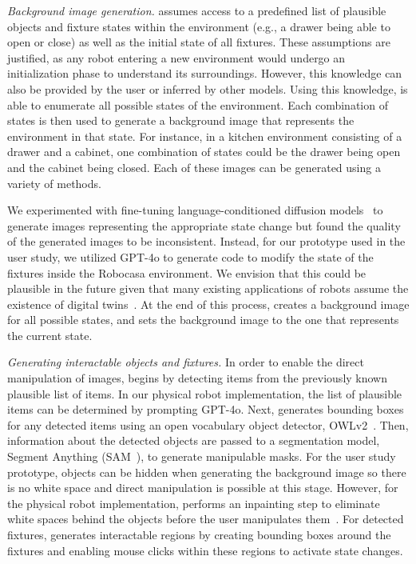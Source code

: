 \noindent \emph{Background image generation.} \projname assumes access to a predefined list of plausible objects and fixture states within the environment (e.g., a drawer being able to open or close) as well as the initial state of all fixtures. These assumptions are justified, as any robot entering a new environment would undergo an initialization phase to understand its surroundings. However, this knowledge can also be provided by the user or inferred by other models. Using this knowledge, \projname is able to enumerate all possible states of the environment. Each combination of states is then used to generate a background image that represents the environment in that state. For instance, in a kitchen environment consisting of a drawer and a cabinet, one combination of states could be the drawer being open and the cabinet being closed. Each of these images can be generated using a variety of methods. 

We experimented with fine-tuning language-conditioned diffusion models~\cite{brooks2023instructpix2pix, black2023zero} to generate images representing the appropriate state change but found the quality of the generated images to be inconsistent. Instead, for our prototype used in the user study, we utilized GPT-4o to generate code to modify the state of the fixtures inside the Robocasa environment. We envision that this could be plausible in the future given that many existing applications of robots assume the existence of digital twins~\cite{li2024evaluating}. At the end of this process, \projname creates a background image for all possible states, and sets the background image to the one that represents the current state.

\noindent \emph{Generating interactable objects and fixtures.} In order to enable the direct manipulation of images, \projname begins by detecting items from the previously known plausible list of items. In our physical robot implementation, the list of plausible items can be determined by prompting GPT-4o. Next, \projname generates bounding boxes for any detected items using an open vocabulary object detector, OWLv2~\cite{minderer2024scaling}. Then, information about the detected objects are passed to a segmentation model, Segment Anything (SAM~\cite{kirillov2023segment}), to generate manipulable masks. For the user study prototype, objects can be hidden when generating the background image so there is no white space and direct manipulation is possible at this stage. However, for the physical robot implementation, \projname performs an inpainting step to eliminate white spaces behind the objects before the user manipulates them~\cite{suvorov2022resolution}. For detected fixtures, \projname generates interactable regions by creating bounding boxes around the fixtures and enabling mouse clicks within these regions to activate state changes. 

